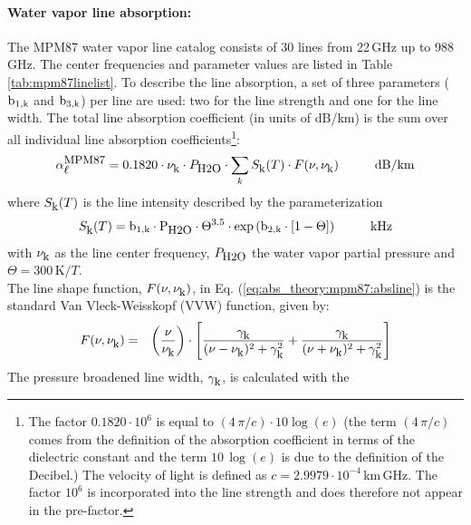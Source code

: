 \paragraph{Water vapor line absorption:}
\label{levele:mpm87_h2olines}
The MPM87 \citep{liebeandlayton:87} water vapor line catalog consists 
of 30 lines from 22\,GHz up to 988\,GHz. The center frequencies and parameter 
values are listed in Table \ref{tab:mpm87linelist}. To describe the line 
absorption, a set of three parameters ($\rm b_{\rm 1,k}$ and $\rm b_{\rm 3,k}$) per line are used: two 
for the line strength and one for the line width. The total line 
absorption coefficient (in units of dB/km) is the sum over all 
individual line absorption coefficients\footnote{The factor 
  $0.1820 \cdot 10^{6}$ is equal to $(4\,\pi/c)\cdot 10\log{(e)}$
  (the term $(4\,\pi/c)$ comes from the definition of the absorption
  coefficient in terms of the dielectric constant and the term 
  $10\,\log{(e)}$ is due to the definition of the Decibel.) The
  velocity of light is defined as $c=2.9979\cdot 10^{-4}$\,km\,GHz. 
  The factor $10^{6}$ is incorporated into the line strength and 
  does therefore not appear in the pre-factor.}:
\begin{equation}
  \label{eq:abs_theory:mpm87:absline}
  \alphampmol = 0.1820 \cdot \nuk \cdot \phzo \cdot 
  \sum_{k}{\inten \cdot \shape}\hspace*{10mm}\mbox{dB/km}
\end{equation}
where $S_{\mbox{\rm \small k}}(T)$ is the line intensity described by the parameterization
\begin{equation}
  \label{eq:abs_theory:mpm87:strength}
  \inten = \bek \cdot \phzo \cdot \Theta^{3.5} 
           \cdot \exp{(\bzk \cdot [1-\Theta])}\hspace*{10mm}\mbox{kHz}
\end{equation}
with $\nu_{\mbox{\rm \small k}}$ as the line center frequency, $P_{\mbox{\rm \small H2O}}$ the water
vapor partial pressure and $\Theta = 300\,\mbox{K}/T$.\\
The line shape function, $F(\nu,\nu_{\mbox{\rm \small k}})$, in Eq. (\ref{eq:abs_theory:mpm87:absline}) 
is the standard Van Vleck-Weisskopf (VVW) function, given by:
\begin{eqnarray}
  \label{eq:abs_theory:mpm87:VVW}
  F(\nu,\nu_{\mbox{\rm \small k}}) & = & \left(\frac{\nu}{\nu_{\mbox{\rm \small k}}}\right) \cdot 
               \left[\frac{\gamma_{\mbox{\rm \small k}}}{(\nu - \nu_{\mbox{\rm \small k}})^2 + \gamma_{\mbox{\rm \small k}}^2} + 
                     \frac{\gamma_{\mbox{\rm \small k}}}{(\nu + \nu_{\mbox{\rm \small k}})^2 + \gamma_{\mbox{\rm \small k}}^2}\right]\\
\end{eqnarray}
The pressure broadened line width, $\gamma_{\mbox{\rm \small k}}$, is calculated with the 
